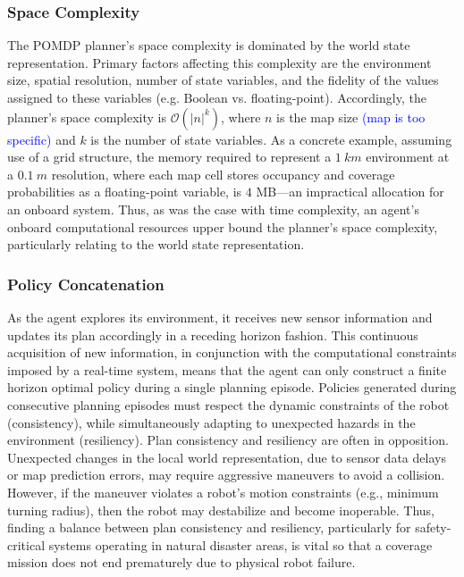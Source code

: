 \documentclass[letterpaper]{article} %
\begin{document}
\subsubsection{Space Complexity} \hfill

\noindent
The POMDP planner's space complexity is dominated by the world state representation. Primary factors affecting this complexity are the environment size, spatial resolution, number of state variables, and the fidelity of the values assigned to these variables (e.g. Boolean vs. floating-point). Accordingly, the planner's space complexity is $\mathcal{O}(|n|^k)$, where $n$ is the map size \textcolor{blue}{(map is too specific)} and $k$ is the number of state variables. As a concrete example, assuming use of a grid structure, the memory required to represent a $1~km$ environment at a $0.1~m$ resolution, where each map cell stores occupancy and coverage probabilities as a floating-point variable, is $4$ MB---an impractical allocation for an onboard system. Thus, as was the case with time complexity, an agent's onboard computational resources upper bound the planner's space complexity, particularly relating to the world state representation.

\subsubsection{Policy Concatenation} \hfill

\noindent
As the agent explores its environment, it receives new sensor information and updates its plan accordingly in a receding horizon fashion. This continuous acquisition of new information, in conjunction with the computational constraints imposed by a real-time system, means that the agent can only construct a finite horizon optimal policy during a single planning episode. Policies generated during consecutive planning episodes must respect the dynamic constraints of the robot (consistency), while simultaneously adapting to unexpected hazards in the environment (resiliency). Plan consistency and resiliency are often in opposition. Unexpected changes in the local world representation, due to sensor data delays or map prediction errors, may require aggressive maneuvers to avoid a collision. However, if the maneuver violates a robot's motion constraints (e.g., minimum turning radius), then the robot may destabilize and become inoperable. Thus, finding a balance between plan consistency and resiliency, particularly for safety-critical systems operating in natural disaster areas, is vital so that a coverage mission does not end prematurely due to physical robot failure. 
\end{document}
